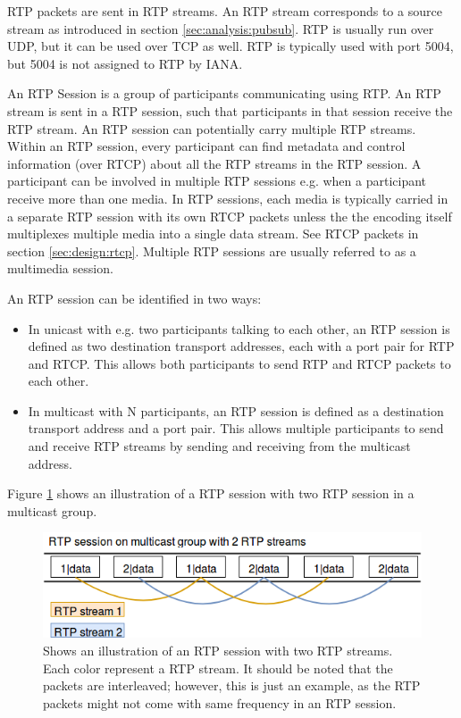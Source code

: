 \label{sec:design:rtpstream}
RTP packets are sent in RTP streams. An RTP stream corresponds to a source stream as introduced in section \ref{sec:analysis:pubsub}. RTP is usually run over UDP, but it can be used over TCP as well. RTP is typically used with port 5004, but 5004 is not assigned to RTP by IANA\citep{iana_ports}.


 \label{sec:design:rtpsession}
An RTP Session is a group of participants communicating using RTP.
An RTP stream is sent in a RTP session, such that participants in that session receive the RTP stream. An RTP session can potentially carry multiple RTP streams. Within an RTP session, every participant can find metadata and control information (over RTCP) about all the RTP streams in the RTP session. A participant can be involved in multiple RTP sessions e.g. when a participant receive more than one media. In RTP sessions, each media is typically carried in a separate RTP session with its own RTCP packets unless the the encoding itself multiplexes multiple media into a single data stream. See RTCP packets in section \ref{sec:design:rtcp}. Multiple RTP sessions are usually referred to as a multimedia session.


An RTP session can be identified in two ways:
\begin{itemize}
	\item In unicast with e.g. two participants talking to each other, an RTP session is defined as two destination transport addresses, each with a port pair for RTP and RTCP. This allows both participants to send RTP and RTCP packets to each other.
	\item In multicast with N participants, an RTP session is defined as a destination transport address and a port pair. This allows multiple participants to send and receive RTP streams by sending and receiving from the multicast address.
\end{itemize}


Figure  \ref{fig:design:rtp:session} shows an illustration of a RTP session with two RTP session in a multicast group.
\begin{figure}[H]
	\centering
	\includegraphics[width=\textwidth]{figures/rtp-session}
	\caption{Shows an illustration of an RTP session with two RTP streams. Each color represent a RTP stream. It should be noted that the packets are interleaved; however, this is just an example, as the RTP packets might not come with same frequency in an RTP session.} \label{fig:design:rtp:session}
\end{figure}

